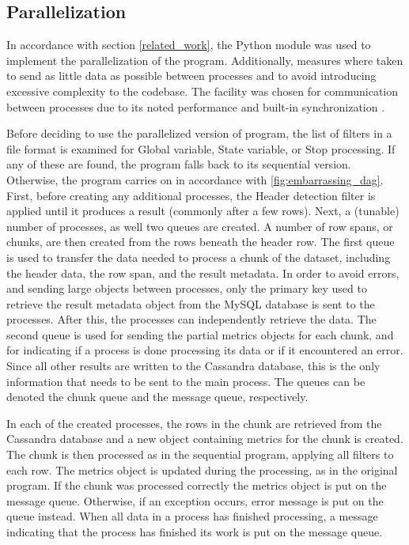 \subsection{Parallelization}
In accordance with section \ref{related_work}, the Python  module was used to implement the parallelization of the program. Additionally, measures where taken to send as little
data as possible between processes and to avoid introducing excessive complexity to the codebase. The  facility was chosen for communication between processes due to its
noted performance and built-in synchronization \cite{singh_2013_parallel_padpwprfmm}.

Before deciding to use the parallelized version of program, the list of filters in a file format is examined for Global variable, State variable, or Stop processing. If any of these are found, the
program falls back to its sequential version. Otherwise, the program carries on in accordance with \ref{fig:embarrassing_dag}. First, before creating any additional processes, the Header detection filter
is applied until it produces a result (commonly after a few rows). Next, a (tunable) number of processes, as well two queues are created. A number of row spans, or chunks, are then created from the rows beneath
the header row. The first queue is used to transfer the data needed to process a chunk of the dataset, including the header data, the row span, and the result metadata. In order to avoid errors, and sending large
objects between processes, only the primary key used to retrieve the result metadata object from the MySQL database is sent to the processes. After this, the processes can independently retrieve the data. The second
queue is used for sending the partial metrics objects for each chunk, and for indicating if a process is done processing its data or if it encountered an error. Since all other results are written to the Cassandra
database, this is the only information that needs to be sent to the main process. The queues can be denoted the chunk queue and the message queue, respectively.

In each of the created processes, the rows in the chunk are retrieved from the Cassandra database and a new object containing metrics for the chunk is created. The chunk is then processed as in the sequential program,
applying all filters to each row. The metrics object is updated during the processing, as in the original program. If the chunk was processed correctly the metrics object is put on the message queue. Otherwise,
if an exception occurs, error message is put on the queue instead. When all data in a process has finished processing, a message indicating that the process has finished its work is put on the message queue.

